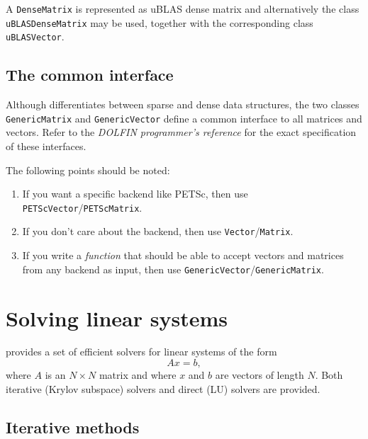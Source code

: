 A \texttt{DenseMatrix} is represented as uBLAS dense matrix and
alternatively the class \texttt{uBLASDenseMatrix} may be used,
together with the corresponding class \texttt{uBLASVector}.

\subsection{The common interface}

Although \dolfin{} differentiates between sparse and dense data
structures, the two classes \texttt{GenericMatrix} and
\texttt{GenericVector} define a common interface to all matrices and
vectors. Refer to the \emph{DOLFIN programmer's reference} for the
exact specification of these interfaces.

The following points should be noted:
\begin{enumerate}
\item
  If you want a specific backend like PETSc, then use
  \texttt{PETScVector}/\texttt{PETScMatrix}.
\item
  If you don't care about the backend, then use \texttt{Vector}/\texttt{Matrix}.
\item
  If you write a \emph{function} that should be able to accept vectors
  and matrices from any backend as input, then use
  \texttt{GenericVector}/\texttt{GenericMatrix}.
\end{enumerate}

\section{Solving linear systems}

\dolfin{} provides a set of efficient solvers for linear systems of
the form
\begin{equation}
  Ax = b,
\end{equation}
where $A$ is an $N\times N$ matrix and where $x$ and $b$ are vectors
of length $N$. Both iterative (Krylov subspace) solvers and direct
(LU) solvers are provided.

\subsection{Iterative methods}

